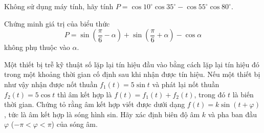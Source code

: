 \begin{vd}[VDT]%
	Không sử dụng máy tính, hãy tính $ P =\cos 10^{\circ}\cos35^{\circ} - \cos55^{\circ}\cos80^{\circ}.$
\end{vd}
\begin{vd}[VDT]%
	Chứng minh giá trị của biểu thức
	$$P = \sin \left(\dfrac{\pi}{6}-\alpha\right) + \sin \left(\dfrac{\pi}{6} + \alpha\right) -\cos \alpha$$
	không phụ thuộc vào $\alpha$.
\end{vd}
\begin{vd}[VDC]%
	Một thiết bị trễ kỹ thuật số lặp lại tín hiệu đầu vào bằng cách lặp lại tín hiệu đó trong một khoảng thời gian cố định sau khi nhận được tín hiệu. Nếu một thiết bị như vậy nhận được nốt thuần $f_1(t) = 5\sin t$ và phát lại nốt thuần $f_2(t) = 5\cos t$ thì âm kết hợp là $f(t)=f_1(t)+f_2(t)$, trong đó $t$ là biến thời gian. Chứng tỏ rằng âm kết hợp viết được dưới dạng $f(t) = k\sin(t+\varphi)$, tức là âm kết hợp là sóng hình sin. Hãy xác định biên độ âm $k$ và pha ban đầu $\varphi$ ($-\pi < \varphi <\pi$) của sóng âm.
\end{vd}

